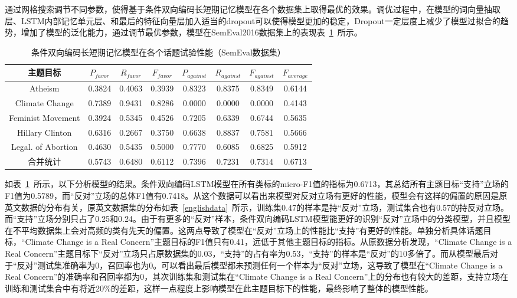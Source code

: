通过网格搜索调节不同参数，使得基于条件双向编码长短期记忆模型在各个数据集上取得最优的效果。调优过程中，在模型的词向量抽取层、LSTM内部记忆单元层、和最后的特征向量层加入适当的dropout可以使得模型更加的稳定，Dropout一定层度上减少了模型过拟合的趋势，增加了模型的泛化能力，通过调节最优参数，模型在SemEval2016数据集上的表现表~\ref{conditional_semeval}~所示。
\begin{table}[htbp]
	\caption[table123]{条件双向编码长短期记忆模型在各个话题试验性能（SemEval数据集）}
	\label{conditional_semeval}
	\vspace{0.5em}\centering\wuhao
	\begin{tabular}{cccccccc}
		\toprule[1.5pt]
		主题目标& $P_{favor}$&$R_{favor}$&$F_{favor}$&$P_{against}$&$R_{against}$&$F_{against}$&$F_{average}$ \\
		\midrule[1pt]
		Atheism&0.3824&0.4063&0.3939&0.8323&0.8375&0.8349&0.6144\\
		Climate Change&0.7389&0.9431&0.8286&0.0000&0.0000&0.0000&0.4143\\
		Feminist Movement&0.3924&0.5345&0.4526&0.7205&0.6339&0.6744&0.5635\\
		Hillary Clinton&0.6316&0.2667&0.3750&0.6638&0.8837&0.7581&0.5666\\
		Legal. of Abortion&0.4630&0.5435&0.5000&0.7770&0.6085&0.6825&0.5912\\
		合并统计&0.5743&0.6480&0.6112&0.7396&0.7231&0.7314&0.6713\\
		\bottomrule[1.5pt]
	\end{tabular}
\end{table}

如表~\ref{conditional_semeval}~所示，以下分析模型的结果。条件双向编码LSTM模型在所有类标的micro-F1值的指标为0.6713，其总结所有主题目标“支持”立场的F1值为0.5789，而“反对”立场的总体F1值有0.7418。从这个数据可以看出来模型对反对立场有更好的性能，模型会有这样的偏置的原因是原英文数据的分布有关，原英文数据集的分布如表~\ref{englishdata}~所示，训练集0.47的样本是持“反对”立场，测试集合也有0.57的持反对立场。而“支持”立场分别只占了0.25和0.24。由于有更多的“反对”样本，条件双向编码LSTM模型能更好的识别“反对”立场中的分类模型，并且模型在不平均数据集上会对高频的类有先天的偏置。这两点导致了模型在“反对”立场上的性能比“支持”有更好的性能。单独分析具体话题目标，“Climate Change is a Real Concern”主题目标的F1值只有0.41，远低于其他主题目标的指标。从原数据分析发现，“Climate Change is a Real Concern”主题目标下“反对”立场只占原数据集的0.03，“支持”的占有率为0.53，“支持”的样本是“反对”的10多倍了。而从模型最后对于“反对”测试集准确率为0，召回率也为0。可以看出最后模型都未预测任何一个样本为“反对”立场，这导致了模型在“Climate Change is a Real Concern”的准确率和召回率都为0，其次训练集和测试集在“Climate Change is a Real Concern”上的分布也有较大的差距，支持立场在训练和测试集合中有将近20\%的差距，这样一点程度上影响模型在此主题目标下的性能，最终影响了整体的模型性能。

